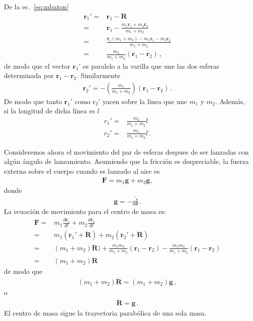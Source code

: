 De la ec.~\eqref{eq:mbaton}
\begin{align}
  \mathbf{r}_1'=&\mathbf{r}_1-\mathbf{R}\nonumber\\
  =&\mathbf{r}_1-\frac{m_1\mathbf{r}_1+m_2\mathbf{r}_2}{m_1+m_2}\nonumber\\
    =&\frac{\mathbf{r}_1(m_1+m_2)-m_1\mathbf{r}_1-m_2\mathbf{r}_2}{m_1+m_2}\nonumber\\
    =&\frac{m_2}{m_1+m_2}(\mathbf{r}_1-\mathbf{r}_2)\,,
\end{align}
de modo que el vector $\mathbf{r}_1'$ es paralelo a la varilla que une las dos esferas determinada por $\mathbf{r}_1-\mathbf{r}_2$. Similarmente
\begin{align}
 \mathbf{r}_2'=-\left(\frac{m_1}{m_1+m_2} \right)\left(\mathbf{r}_1-\mathbf{r}_2 \right)\,.
\end{align}
De modo que tanto $\mathbf{r}_1'$ como $\mathrm{r}_2'$ yacen sobre la línea que une $m_1$ y $m_2$. Además, si la longitud de dicha línea es $l$
\begin{align}
  r_1'=&\frac{m_2}{m_1+m_2}l\nonumber\\
  r_2'=&\frac{m_1}{m_1+m_2}l\,.
\end{align}

Consideremos ahora el movimiento del par de esferas despues de ser
lanzadas con algún ángulo de lanzamiento.
Asumiendo que la fricción es despreciable, la fuerza externa sobre el
cuerpo cuando es lanzado al aire es
\begin{align}
  \mathbf{F}=m_1\mathbf{g}+m_2\mathbf{g},
\end{align}
donde
\begin{align}
  \mathbf{g}=-g\hat{\mathbf{j}}\,.
\end{align}
La ecuación de movimiento para el centro de masa es:
\begin{align*}
  \mathbf{F}=&m_1\frac{d\dot{\mathbf{r}}_1}{dt}+m_2\frac{d\dot{\mathbf{r}_2}}{dt}\nonumber\\
=&m_1(\ddot{\mathbf{r}}_1'+\ddot{\mathbf{R}})+m_2(\ddot{\mathbf{r}}_2'+\ddot{\mathbf{R}})\nonumber\\
=&(m_1+m_2)\ddot{\mathbf{R}})+\frac{m_1m_2}{m_1+m_2}(\mathbf{r}_1-\mathbf{r}_2)
                            -\frac{m_1m_2}{m_1+m_2}(\mathbf{r}_1-\mathbf{r}_2)\nonumber\\
=&(m_1+m_2)\ddot{\mathbf{R}}
\end{align*}
de modo que
\begin{align}
  \left(m_1+m_2 \right)\ddot{\mathbf{R}}=\left(m_1+m_2 \right)\mathbf{g}\,,
\end{align}
o
\begin{align}
  \ddot{\mathbf{R}}=\mathbf{g}\,.
\end{align}
El centro de masa sigue la trayectoria parabólica de una sola masa.
\finejemplo

